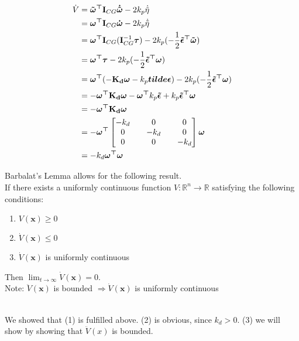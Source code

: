 \begin{align*}
 \dot V &= \boldsymbol{\tilde \omega^\top}  \mathbf{I}_{CG} \boldsymbol{\dot{\tilde \omega}} - 2k_p\dot{\tilde \eta} \\
    &=  \boldsymbol{\omega^\top}  \mathbf{I}_{CG}\boldsymbol{\dot{ \omega}} - 2k_p\dot{\tilde \eta}\\
    &=    \boldsymbol{\omega^\top}  \mathbf{I}_{CG}(\mathbf{I}_{CG}^{-1} \boldsymbol{\tau}) - 2k_p(-\frac{1}{2} \boldsymbol{\tilde \epsilon^\top \tilde \omega}) \\
    &=  \boldsymbol{\omega^\top}  \boldsymbol{\tau} - 2k_p(-\frac{1}{2} \boldsymbol{\tilde \epsilon^\top \omega}) \\
    &=  \boldsymbol{\omega^\top}  (-\mathbf{K_d}\boldsymbol{\omega} - k_p \boldsymbol{tilde \epsilon}) - 2k_p(-\frac{1}{2} \boldsymbol{\tilde \epsilon^\top  \omega}) \\
    &= - \boldsymbol{\omega^\top} \mathbf{K_d} \boldsymbol{\omega} - \boldsymbol{\omega^\top} k_p \boldsymbol{\tilde \epsilon} + k_p \boldsymbol{\tilde \epsilon^\top \omega} \\
    &= - \boldsymbol{\omega^\top} \mathbf{K_d} \boldsymbol{\omega} \\
    &= - \boldsymbol{\omega^\top} \begin{bmatrix}-k_d && 0 && 0 \\ 0 && -k_d && 0 \\ 0 && 0 && -k_d\end{bmatrix} \boldsymbol{\omega} \\
    &= -k_d  \boldsymbol{\omega^\top} \boldsymbol{\omega} 
\end{align*}


Barbalat's Lemma allows for the following result. \\
If there exists a uniformly continuous function $V: \mathbb{R}^n \rightarrow \mathbb{R}$ satisfying the following conditions:

\begin{enumerate}  
\item $V(\mathbf{x}) \geq 0$
\item $\dot V(\mathbf{x}) \leq 0$
\item $\dot V(\mathbf{x})$ is uniformly continuous 
\end{enumerate}

Then $\lim_{t \rightarrow \infty} \dot V(\mathbf{x}) = 0$. \\
Note: $\ddot V(\mathbf{x})$ is bounded $\Rightarrow \dot{V}(\mathbf{x})$ is uniformly continuous



\\We showed that (1) is fulfilled above. (2) is obvious, since $k_d > 0$. (3) we will show by showing that $\ddot V(x)$ is bounded.

